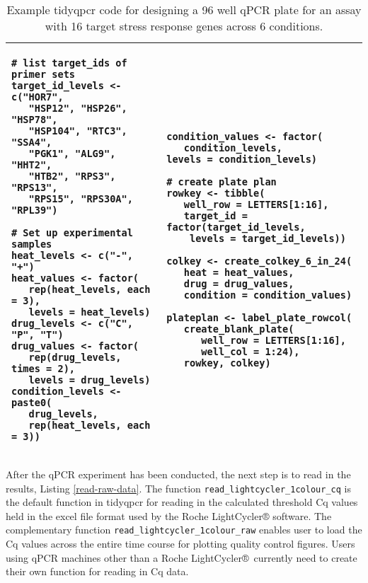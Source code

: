 \documentclass[../main.tex]{subfiles}
\begin{document}
\makeatletter
\renewcommand{\fnum@table}{Listing \thetable}
\makeatother

\begin{table}
\centering
\begin{tabular}{ |p{5.6cm}  p{5.6cm}|}
\hline
  \begin{lstlisting}[style=mystyle]
# list target_ids of primer sets
target_id_levels <- c("HOR7",
   "HSP12", "HSP26", "HSP78",
   "HSP104", "RTC3", "SSA4",
   "PGK1", "ALG9", "HHT2",
   "HTB2", "RPS3", "RPS13",
   "RPS15", "RPS30A", "RPL39")

# Set up experimental samples
heat_levels <- c("-", "+")
heat_values <- factor(
   rep(heat_levels, each = 3),
   levels = heat_levels)
drug_levels <- c("C", "P", "T")
drug_values <- factor(
   rep(drug_levels, times = 2),
   levels = drug_levels)
condition_levels <- paste0(
   drug_levels,
   rep(heat_levels, each = 3))
\end{lstlisting}
 & 
 \begin{lstlisting}[firstnumber=20,style=mystyle]
condition_values <- factor(
   condition_levels,
levels = condition_levels)
 
# create plate plan
rowkey <- tibble(
   well_row = LETTERS[1:16],
   target_id = factor(target_id_levels, 
    levels = target_id_levels))

colkey <- create_colkey_6_in_24(
   heat = heat_values,
   drug = drug_values,
   condition = condition_values)

plateplan <- label_plate_rowcol(
   create_blank_plate(
      well_row = LETTERS[1:16],
      well_col = 1:24),
   rowkey, colkey)
\end{lstlisting} \\ 
\hline
\end{tabular}
\caption{Example tidyqpcr code for designing a 96 well qPCR plate for an assay with 16 target stress response genes across 6 conditions.}
\label{tab:create-plate-plan}
\end{table}
After the qPCR experiment has been conducted, the next step is to read in the results, Listing \ref{read-raw-data}. 
The function \lstinline{read_lightcycler_1colour_cq} is the default function in tidyqpcr for reading in the calculated threshold Cq values held in the excel file format used by the Roche LightCycler® software. 
The complementary function \lstinline{read_lightcycler}\lstinline{_1colour_raw} enables user to load the Cq values across the entire time course for plotting quality control figures. 
Users using qPCR machines other than a Roche LightCycler® currently need to create their own function for reading in Cq data. 
\end{document}
